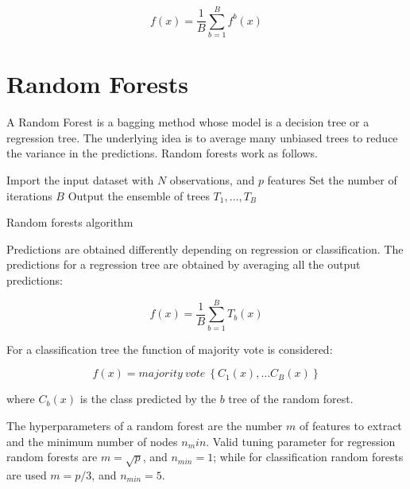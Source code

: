 \begin{equation}
f\left(x\right)=\frac{1}{B}\sum_{b=1}^{B}{f^b(x)}
\label{eq_bagging}
\end{equation}

\section{Random Forests}
A Random Forest is a bagging method whose model is a decision tree or a regression tree. The underlying idea is to average many unbiased trees to reduce the variance in the predictions. Random forests work as follows.

\begin{algorithm}[H]
\DontPrintSemicolon
\SetAlgoLined
Import the input dataset with $N$ observations, and $p$ features\;
Set the number of iterations $B$\;
Output the ensemble of trees ${T_1,\ldots,T_B}$\;

\caption{Random forests algorithm}
\label{algo_randomForest}
\end{algorithm}

Predictions are obtained differently depending on regression or classification. The predictions for a regression tree are obtained by averaging all the output predictions:

\begin{equation}
f\left(x\right)=\frac{1}{B}\sum_{b=1}^{B}{T_b\left(x\right)}
\label{eq_randomRegression}
\end{equation}

For a classification tree the function of majority vote is considered:

\begin{equation}
 f\left(x\right)=majority\ vote\ \left\{C_1\left(x\right),\ldots C_B(x)\right\} 
\label{eq_randomClassification}
\end{equation}

where $C_b(x)$ is the class predicted by the $b$ tree of the random forest.\par

The hyperparameters of a random forest are the number $m$ of features to extract and the minimum number of nodes $n_min$. Valid tuning parameter for regression random forests are $m=\sqrt p$, and $n_{min}=1$; while for classification random forests are used $m=p/3$, and $n_{min}=5$.\par

